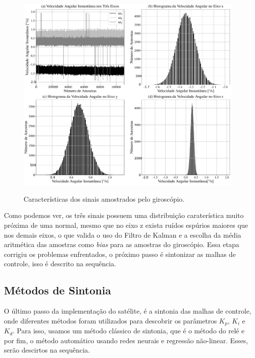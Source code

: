 \begin{figure}[H]
  \caption{Características dos sinais amostrados pelo giroscópio.}
      \includegraphics[scale=.4]{metodologia/img/bias_correction}
  \label{fig:bias_correction}
\end{figure}

Como podemos ver, os três sinais possuem uma distribuição caraterística muito próxima de uma normal, mesmo que no eixo z exista ruídos espúrios maiores que nos demais eixos, o que valida o uso do Filtro de Kalman e a escolha da média aritmética das amostras como \textit{bias} para as amostras do giroscópio. Essa etapa corrigiu os problemas enfrentados, o próximo passo é sintonizar as malhas de controle, isso é descrito na sequência.



\subsection{Métodos de Sintonia}

O último passo da implementação do satélite, é a sintonia das malhas de controle, onde diferentes métodos foram utilizados para descobrir os parâmetros \textit{$K_p$}, \textit{$K_i$} e \textit{$K_d$}. Para isso, usamos um método clássico de sintonia, que é o método do relé e por fim, o método automático usando redes neurais e regressão não-linear. Esses, serão descirtos na sequência. 


